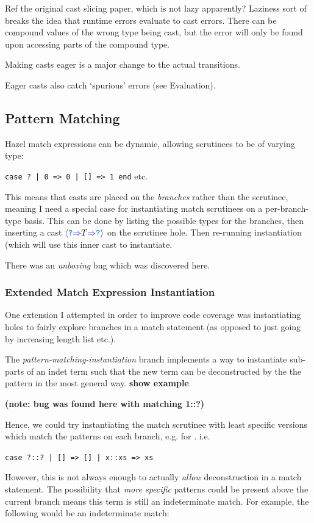 Ref the original cast slicing paper, which is not lazy apparently? Laziness sort of breaks the idea that runtime errors evaluate to cast errors. There can be compound values of the wrong type being cast, but the error will only be found upon accessing parts of the compound type.

Making casts eager is a major change to the actual transitions.

Eager casts also catch `spurious' errors (see Evaluation).


\subsection{Pattern Matching}
\label{sec:PatternMatching}
Hazel match expressions can be dynamic, allowing scrutinees to be of varying type:

\texttt{case ? | 0 => 0 | [] => 1 end} etc.

This means that casts are placed on the \textit{branches} rather than the scrutinee, meaning I need a special case for instantiating match scrutinees on a per-branch-type basis. This can be done by listing the possible types for the branches, then inserting a cast ${\color{blue}\langle} {\color{teal}\texttt{?}} {\color{blue}\Rightarrow} T {\color{blue}\Rightarrow} {\color{teal}\texttt{?}} {\color{blue}\rangle}$ on the scrutinee hole. Then re-running instantiation (which will use this inner cast to instantiate.

There was an \textit{unboxing} bug which was discovered here.

\subsubsection{Extended Match Expression Instantiation}
One extension I attempted in order to improve code coverage was instantiating holes to fairly explore branches in a match statement (as opposed to just going by increasing length list etc.). 

The \textit{pattern-matching-instantiation} branch implements a way to instantiate sub-parts of an indet term such that the new term can be deconstructed by the the pattern in the most general way. \textbf{show example}

\textbf{(note: bug was found here with matching 1::?)}

Hence, we could try instantiating the match scrutinee with least specific versions which match the patterns on each branch, e.g.  for . i.e. 

\texttt{case ?::? | [] => [] | x::xs => xs}

However, this is not always enough to actually \textit{allow} deconstruction in a match statement. The possibility that \textit{more specific} patterns could be present above the current branch means this term is still an indeterminate match. For example, the following would be an indeterminate match:

